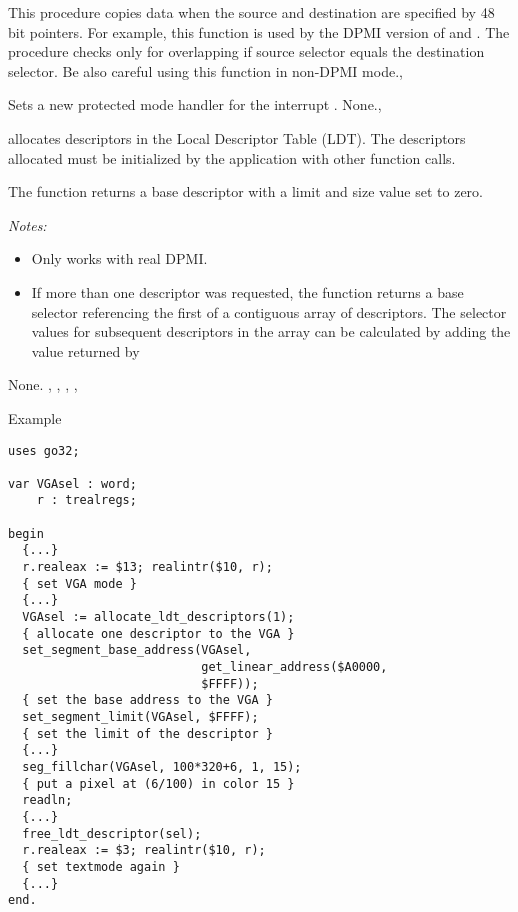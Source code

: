 
{This procedure copies data when the source and destination are specified
by 48 bit pointers. For example, this function is used by the DPMI version
of  and . }{The procedure checks only
for overlapping if source selector equals the destination selector. 
Be also careful using this function in non-DPMI
mode.}{,}

{Sets a new protected mode handler for the interrupt .}
{None.}{, } 

{ allocates  descriptors in the 
Local Descriptor Table (LDT).
The descriptors allocated must be initialized by the application with
other function calls.

The function returns a base descriptor with a limit and size value set to 
zero.

{\em Notes:}
\begin{itemize}
\item Only works with real DPMI.
\item If more than one descriptor was requested, the function returns a base
selector referencing the first of a contiguous array of descriptors. The
selector values for subsequent descriptors in the array can be
calculated by adding the value returned by
\end{itemize}
}{None.}{
,
,
,
,
}
\begin{FPKList}
\item[Example]
\begin{verbatim}
uses go32;

var VGAsel : word;
    r : trealregs;

begin
  {...}
  r.realeax := $13; realintr($10, r); 
  { set VGA mode }
  {...}
  VGAsel := allocate_ldt_descriptors(1); 
  { allocate one descriptor to the VGA }
  set_segment_base_address(VGAsel, 
                           get_linear_address($A0000,
                           $FFFF)); 
  { set the base address to the VGA }
  set_segment_limit(VGAsel, $FFFF); 
  { set the limit of the descriptor }
  {...}
  seg_fillchar(VGAsel, 100*320+6, 1, 15); 
  { put a pixel at (6/100) in color 15 }
  readln;
  {...}
  free_ldt_descriptor(sel);
  r.realeax := $3; realintr($10, r); 
  { set textmode again }
  {...}
end.
\end{verbatim}
\end{FPKList}

